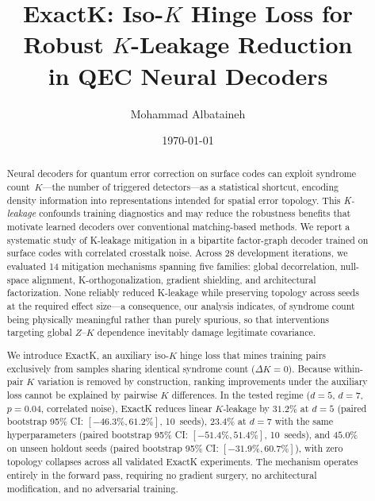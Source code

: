 
\title{ExactK: Iso-$K$ Hinge Loss for Robust $K$-Leakage Reduction\\in QEC Neural Decoders}

\author{Mohammad Albataineh}

\date{\today}

\begin{abstract}
Neural decoders for quantum error correction on surface codes can exploit syndrome count~$K$---the number of triggered detectors---as a statistical shortcut, encoding density information into representations intended for spatial error topology. This \emph{K-leakage} confounds training diagnostics and may reduce the robustness benefits that motivate learned decoders over conventional matching-based methods. We report a systematic study of K-leakage mitigation in a bipartite factor-graph decoder trained on surface codes with correlated crosstalk noise. Across 28 development iterations, we evaluated 14 mitigation mechanisms spanning five families: global decorrelation, null-space alignment, K-orthogonalization, gradient shielding, and architectural factorization. None reliably reduced K-leakage while preserving topology across seeds at the required effect size---a consequence, our analysis indicates, of syndrome count being physically meaningful rather than purely spurious, so that interventions targeting global $Z$--$K$ dependence inevitably damage legitimate covariance.

We introduce ExactK, an auxiliary iso-$K$ hinge loss that mines training pairs exclusively from samples sharing identical syndrome count ($\Delta K = 0$). Because within-pair $K$ variation is removed by construction, ranking improvements under the auxiliary loss cannot be explained by pairwise $K$ differences. In the tested regime ($d{=}5$, $d{=}7$, $p{=}0.04$, correlated noise), ExactK reduces linear $K$-leakage by $31.2\%$ at $d{=}5$ (paired bootstrap 95\% CI: $[-46.3\%, 61.2\%]$, 10~seeds), $23.4\%$ at $d{=}7$ with the same hyperparameters (paired bootstrap 95\% CI: $[-51.4\%, 51.4\%]$, 10~seeds), and $45.0\%$ on unseen holdout seeds (paired bootstrap 95\% CI: $[-31.9\%, 60.7\%]$), with zero topology collapses across all validated ExactK experiments. The mechanism operates entirely in the forward pass, requiring no gradient surgery, no architectural modification, and no adversarial training.
\end{abstract}

\maketitle
